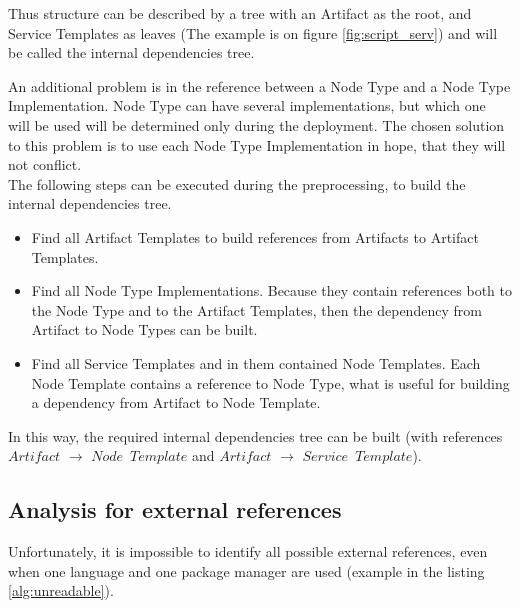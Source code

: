 Thus structure can be described by a tree with an Artifact as the root, and Service Templates as leaves (The example is on figure \ref{fig:script_serv}) and will be called the internal dependencies tree.

An additional problem is in the reference between a Node Type and a Node Type Implementation.
Node Type can have several implementations, but which one will be used will be determined only during the deployment. 
The chosen solution to this problem is to use each Node Type Implementation in hope, that they will not conflict.\\
The following steps can be executed during the preprocessing, to build the internal dependencies tree.
\begin{itemize}
	\item Find all Artifact Templates to build references from Artifacts to Artifact Templates.
	\item Find all Node Type Implementations. Because they contain references both to the Node Type and to the Artifact Templates, then the dependency from Artifact to Node Types can be built.
	\item Find all Service Templates and in them contained Node Templates. Each Node Template contains a reference to Node Type, what is useful for building a dependency from Artifact to Node Template.
\end{itemize} 
In this way, the required internal dependencies tree can be built (with references $Artifact$ $\rightarrow$ $Node$~$Template$ and $Artifact$ $\rightarrow$ $Service$~$Template$).
\subsection{Analysis for external references}
Unfortunately, it is impossible to identify all possible external references, even when one language and one package manager are used (example in the listing \ref{alg:unreadable}).

